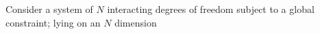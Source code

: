 Consider a system of $N$ interacting degrees of freedom subject to a global constraint; lying on an $N$ dimension